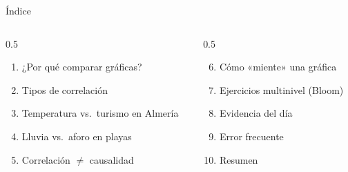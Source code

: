 \documentclass[aspectratio=169, 10pt, spanish]{beamer}
\begin{document}
\begin{frame}[plain]\titlepage\end{frame}

\begin{frame}{Índice}
  \begin{columns}[t]
    \begin{column}{0.5\textwidth}
      \begin{enumerate}
        \item ¿Por qué comparar gráficas?
        \item Tipos de correlación
        \item Temperatura vs.\ turismo en Almería
        \item Lluvia vs.\ aforo en playas
        \item Correlación $\neq$ causalidad
      \end{enumerate}
    \end{column}
    \begin{column}{0.5\textwidth}
      \begin{enumerate}\setcounter{enumi}{5}
        \item Cómo «miente» una gráfica
        \item Ejercicios multinivel (Bloom)
        \item Evidencia del día
        \item Error frecuente
        \item Resumen
      \end{enumerate}
    \end{column}
  \end{columns}
\end{frame}

\end{document}
